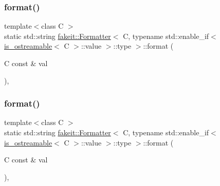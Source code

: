 \subsubsection{\texorpdfstring{format()}{format()}\hspace{0.1cm}{\footnotesize\ttfamily [2/9]}}
{\footnotesize\ttfamily template$<$class C $>$ \\
static std\+::string \mbox{\hyperlink{structfakeit_1_1Formatter}{fakeit\+::\+Formatter}}$<$ C, typename std\+::enable\+\_\+if$<$ \mbox{\hyperlink{classfakeit_1_1is__ostreamable}{is\+\_\+ostreamable}}$<$ C $>$\+::value $>$\+::type $>$\+::format (\begin{DoxyParamCaption}\item[{C const \&}]{val }\end{DoxyParamCaption})\hspace{0.3cm}{\ttfamily [inline]}, {\ttfamily [static]}}

\mbox{\label{structfakeit_1_1Formatter_3_01C_00_01typename_01std_1_1enable__if_3_01is__ostreamable_3_01C_01_4_1_1value_01_4_1_1type_01_4_af196fc780a3f1cfe986246af4c65a718}} 
\subsubsection{\texorpdfstring{format()}{format()}\hspace{0.1cm}{\footnotesize\ttfamily [3/9]}}
{\footnotesize\ttfamily template$<$class C $>$ \\
static std\+::string \mbox{\hyperlink{structfakeit_1_1Formatter}{fakeit\+::\+Formatter}}$<$ C, typename std\+::enable\+\_\+if$<$ \mbox{\hyperlink{classfakeit_1_1is__ostreamable}{is\+\_\+ostreamable}}$<$ C $>$\+::value $>$\+::type $>$\+::format (\begin{DoxyParamCaption}\item[{C const \&}]{val }\end{DoxyParamCaption})\hspace{0.3cm}{\ttfamily [inline]}, {\ttfamily [static]}}

